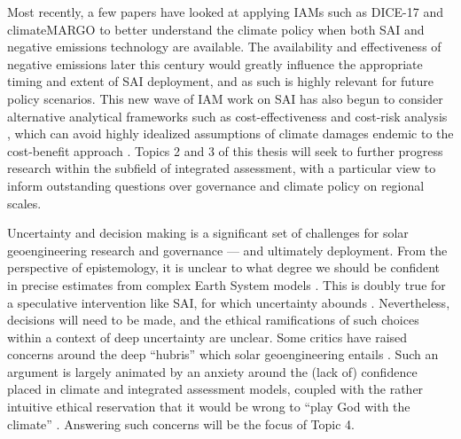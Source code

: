 \documentclass{article}
\begin{document}
Most recently, a few papers have looked at applying IAMs such as DICE-17 \citep{MorenoCruz2020,Belaia2019} and climateMARGO \citep{Drake2020} to better understand the climate policy when both SAI and negative emissions technology are available. The availability and effectiveness of negative emissions later this century would greatly influence the appropriate timing and extent of SAI deployment, and as such is highly relevant for future policy scenarios. This new wave of IAM work on SAI has also begun to consider alternative analytical frameworks such as cost-effectiveness and cost-risk analysis \citep{Drake2020, roshan2016cost, roshan2019cost}, which can avoid highly idealized assumptions of climate damages endemic to the cost-benefit approach \citep{keen2020appallingly}. Topics 2 and 3 of this thesis will seek to further progress research within the subfield of integrated assessment, with a particular view to inform outstanding questions over governance and climate policy on regional scales.\medskip

Uncertainty and decision making is a significant set of challenges for solar geoengineering research and governance --- and ultimately deployment. From the perspective of epistemology, it is unclear to what degree we should be confident in precise estimates from complex Earth System models \citep{morrison2021models}. This is doubly true for a speculative intervention like SAI, for which uncertainty abounds \citep{kravitz2020uncertainty}. Nevertheless, decisions will need to be made, and the ethical ramifications of such choices within a context of deep uncertainty are unclear. Some critics have raised concerns around the deep ``hubris'' which solar geoengineering entails \citep{hamilton2013earthmasters,hamilton2014ethical,meyer2015geoengineering,neuber2020buying}. Such an argument is largely animated by an anxiety around the (lack of) confidence placed in climate and integrated assessment models, coupled with the rather intuitive ethical reservation that it would be wrong to ``play God with the climate'' \citep{hamilton2010ethical}. Answering such concerns will be the focus of Topic 4.



\clearpage
\end{document}
